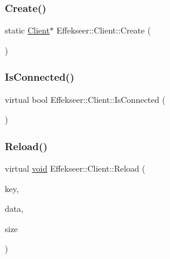 \subsubsection{\texorpdfstring{Create()}{Create()}}
{\footnotesize\ttfamily static \mbox{\hyperlink{class_effekseer_1_1_client}{Client}}$\ast$ Effekseer\+::\+Client\+::\+Create (\begin{DoxyParamCaption}{ }\end{DoxyParamCaption})\hspace{0.3cm}{\ttfamily [static]}}

\mbox{\label{class_effekseer_1_1_client_a83c2f00111623d0fe4536a197b7ac9b7}} 
\subsubsection{\texorpdfstring{Is\+Connected()}{IsConnected()}}
{\footnotesize\ttfamily virtual bool Effekseer\+::\+Client\+::\+Is\+Connected (\begin{DoxyParamCaption}{ }\end{DoxyParamCaption})\hspace{0.3cm}{\ttfamily [pure virtual]}}

\mbox{\label{class_effekseer_1_1_client_a3c80e7d4534a6697e20fc222df7b4598}} 
\subsubsection{\texorpdfstring{Reload()}{Reload()}\hspace{0.1cm}{\footnotesize\ttfamily [1/2]}}
{\footnotesize\ttfamily virtual \mbox{\hyperlink{namespace_effekseer_ab34c4088e512200cf4c2716f168deb56}{void}} Effekseer\+::\+Client\+::\+Reload (\begin{DoxyParamCaption}\item[{const \mbox{\hyperlink{_effekseer_8h_a50b026abea014b47854bcd835b3b6233}{E\+F\+K\+\_\+\+C\+H\+AR}} $\ast$}]{key,  }\item[{\mbox{\hyperlink{namespace_effekseer_ab34c4088e512200cf4c2716f168deb56}{void}} $\ast$}]{data,  }\item[{int32\+\_\+t}]{size }\end{DoxyParamCaption})\hspace{0.3cm}{\ttfamily [pure virtual]}}

